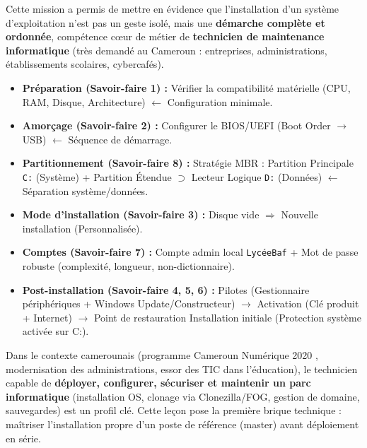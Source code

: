 \documentclass[11pt]{article}
\newcommand{\cle}[1]{{\popxbold\color{popdark}#1}}
\newcounter{popsec}
\newcounter{popsub}
\newcommand{\courssub}[1]{%
  \stepcounter{popsub}%
  \par\vspace{9pt}\noindent{\popxbold\fontsize{11.5}{13}\selectfont\color{popink}{\color{poporange}\thepopsec.\thepopsub}\hspace{6pt}#1}\par\nopagebreak\vspace{4pt}
}
\begin{document}
\courssub{Bilan de la leçon}

Cette mission a permis de mettre en évidence que l'installation d'un système d'exploitation n'est pas un geste isolé, mais une \textbf{démarche complète et ordonnée}, compétence cœur de métier de \textbf{technicien de maintenance informatique} (très demandé au Cameroun : entreprises, administrations, établissements scolaires, cybercafés).

\begin{itemize}
  \item \textbf{Préparation (Savoir-faire 1) :} Vérifier la compatibilité matérielle (CPU, RAM, Disque, Architecture) $\leftarrow$ \cle{Configuration minimale}.
  \item \textbf{Amorçage (Savoir-faire 2) :} Configurer le BIOS/UEFI (Boot Order $\rightarrow$ USB) $\leftarrow$ \cle{Séquence de démarrage}.
  \item \textbf{Partitionnement (Savoir-faire 8) :} Stratégie MBR : Partition Principale \texttt{C:} (Système) + Partition Étendue $\supset$ Lecteur Logique \texttt{D:} (Données) $\leftarrow$ \cle{Séparation système/données}.
  \item \textbf{Mode d'installation (Savoir-faire 3) :} Disque vide $\Rightarrow$ \cle{Nouvelle installation} (Personnalisée).
  \item \textbf{Comptes (Savoir-faire 7) :} Compte admin local \texttt{LycéeBaf} + Mot de passe robuste (complexité, longueur, non-dictionnaire).
  \item \textbf{Post-installation (Savoir-faire 4, 5, 6) :} Pilotes (Gestionnaire périphériques + Windows Update/Constructeur) $\rightarrow$ Activation (Clé produit + Internet) $\rightarrow$ Point de restauration \og Installation initiale \fg{} (Protection système activée sur C:).
\end{itemize}

\begin{savaistu}
Dans le contexte camerounais (programme \og Cameroun Numérique 2020 \fg{}, modernisation des administrations, essor des TIC dans l'éducation), le technicien capable de \textbf{déployer, configurer, sécuriser et maintenir un parc informatique} (installation OS, clonage via Clonezilla/FOG, gestion de domaine, sauvegardes) est un profil clé. Cette leçon pose la première brique technique : maîtriser l'installation \og propre \fg{} d'un poste de référence (master) avant déploiement en série.
\end{savaistu}
\end{document}
